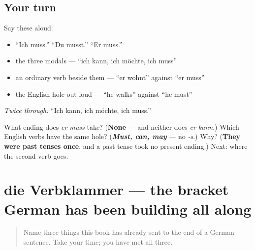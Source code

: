 \subsection*{Your turn}
Say these aloud:

\begin{itemize}
\raggedright
  \item \textquotedblleft{}Ich muss.\textquotedblright{} \textquotedblleft{}Du musst.\textquotedblright{} \textquotedblleft{}Er muss.\textquotedblright{}
  \item the three modals — \textquotedblleft{}ich kann, ich möchte, ich muss\textquotedblright{}
  \item an ordinary verb beside them — \textquotedblleft{}er wohnt\textquotedblright{} against \textquotedblleft{}er muss\textquotedblright{}
  \item the English hole out loud — \textquotedblleft{}he walks\textquotedblright{} against \textquotedblleft{}he must\textquotedblright{}
\end{itemize}

\emph{Twice through:} \textquotedblleft{}Ich kann, ich möchte, ich muss.\textquotedblright{}

\begin{tcolorbox}[breakable,colback=teal!4,colframe=teal!35!black,title={Before you move on}]
What ending does \emph{er muss} take? (\textbf{None} — and neither does \emph{er kann}.) Which English verbs have the same hole? (\emph{\textbf{Must, can, may}} — no \emph{-s}.) Why? (\textbf{They were past tenses once}, and a past tense took no present ending.) Next: where the second verb goes.
\end{tcolorbox}
\section[die Verbklammer]{die Verbklammer — the bracket German has been building all along}

\label{lesson:GE-C38-klammer}



\begin{quote}
Name three things this book has already sent to the end of a German sentence. Take your time; you have met all three.
\end{quote}

